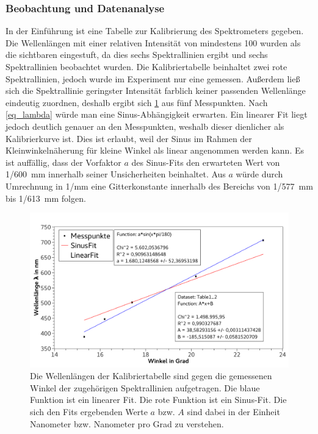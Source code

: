 \documentclass[
	a4paper,
	12pt,
	pagesize,
	ngerman
]{scrartcl}
\begin{document}
	\subsubsection{Beobachtung und Datenanalyse}
	In der Einführung ist eine Tabelle zur Kalibrierung des Spektrometers gegeben. %
	Die Wellenlängen mit einer relativen Intensität von mindestens 100 wurden als die sichtbaren eingestuft, da dies sechs Spektrallinien ergibt und sechs Spektrallinien beobachtet wurden.
	Die Kalibriertabelle beinhaltet zwei rote Spektrallinien, jedoch wurde im Experiment nur eine gemessen.
	Außerdem ließ sich die Spektrallinie geringster Intensität farblich keiner passenden Wellenlänge eindeutig zuordnen, deshalb ergibt sich \cref{fig_helium} aus fünf Messpunkten. %
	Nach \cref{eq_lambda} würde man eine Sinus-Abhängigkeit erwarten. 
	Ein linearer Fit liegt jedoch deutlich genauer an den Messpunkten, weshalb dieser dienlicher als Kalibrierkurve ist.
	Dies ist erlaubt, weil der Sinus im Rahmen der Kleinwinkelnäherung für kleine Winkel als linear angenommen werden kann.
	Es ist auffällig, dass der Vorfaktor $a$ des Sinus-Fits den erwarteten Wert von 1/\SI{600}{mm} innerhalb seiner Unsicherheiten beinhaltet. 
	Aus $a$ würde durch Umrechnung in 1/\si{mm} eine Gitterkonstante innerhalb des Bereichs von 1/\SI{577}{mm} bis 1/\SI{613}{mm} folgen. %
	

	\begin{figure}[H] 
		\includegraphics[width=1\textwidth]{fig_helium} 
		\centering
		\caption{Die Wellenlängen der Kalibriertabelle sind gegen die gemessenen Winkel der zugehörigen Spektrallinien aufgetragen.
		Die blaue Funktion ist ein linearer Fit.
		Die rote Funktion ist ein Sinus-Fit.
		Die sich den Fits ergebenden Werte $a$ bzw. $A$ sind dabei in der Einheit Nanometer bzw. Nanometer pro Grad zu verstehen.}
		\label{fig_helium}
		\centering
	\end{figure}
\end{document}
